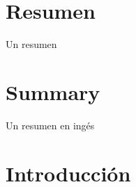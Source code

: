 \documentclass[a4paper, 12pt, oneside]{book}
\begin{document}

\chapter*{Resumen}


Un resumen


\chapter*{Summary}

Un resumen en ingés



\tableofcontents 
\cleardoublepage
\listoffigures %



\cleardoublepage
\chapter{Introducción}
\label{sec:intro} %
\end{document}
